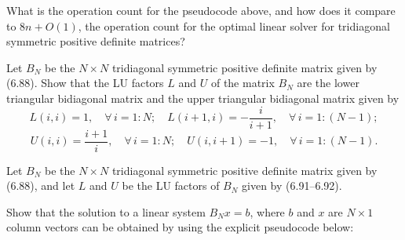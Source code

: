 \begin{exercises}
\begin{subparts}
\item What is the operation count for the pseudocode above, and how does it compare to
$8n + O(1)$, the operation count for the optimal linear solver for tridiagonal
symmetric positive definite matrices?
\end{subparts}

\item Let $B_N$ be the $N \times N$ tridiagonal symmetric positive definite matrix
given by (6.88). Show that the LU factors $L$ and $U$ of the matrix $B_N$ are the
lower triangular bidiagonal matrix and the upper triangular bidiagonal matrix given by
\begin{equation}
L(i,i) = 1, \quad \forall\, i = 1:N; \quad L(i+1,i) = -\frac{i}{i+1}, \quad \forall\, i
= 1:(N-1);
\end{equation}
\begin{equation}
U(i,i) = \frac{i+1}{i}, \quad \forall\, i = 1:N; \quad U(i,i+1) = -1, \quad \forall\, i
= 1:(N-1).
\end{equation}

\item Let $B_N$ be the $N \times N$ tridiagonal symmetric positive definite matrix
given by (6.88), and let $L$ and $U$ be the LU factors of $B_N$ given by (6.91--6.92).

\begin{subparts}
\item Show that the solution to a linear system $B_N x = b$, where $b$ and $x$ are
$N \times 1$ column vectors can be obtained by using the explicit pseudocode below:

\begin{center}
\end{center}


\end{subparts}
\end{exercises}
